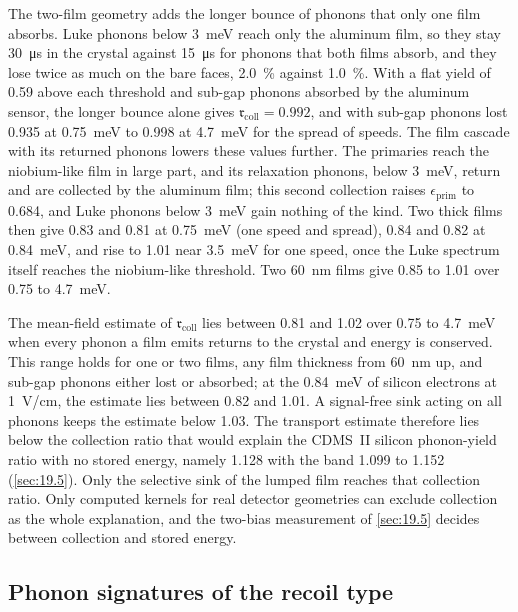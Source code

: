 The two-film geometry adds the longer bounce of phonons that only one film absorbs. Luke phonons below \SI{3}{meV} reach only the aluminum film, so they stay \SI{30}{\micro s} in the crystal against \SI{15}{\micro s} for phonons that both films absorb, and they lose twice as much on the bare faces, \SI{2.0}{\percent} against \SI{1.0}{\percent}. With a flat yield of 0.59 above each threshold and sub-gap phonons absorbed by the aluminum sensor, the longer bounce alone gives $\mathfrak{r}_{\mathrm{coll}} = 0.992$, and with sub-gap phonons lost 0.935 at \SI{0.75}{meV} to 0.998 at \SI{4.7}{meV} for the spread of speeds. The film cascade with its returned phonons lowers these values further. The primaries reach the niobium-like film in large part, and its relaxation phonons, below \SI{3}{meV}, return and are collected by the aluminum film; this second collection raises $\epsilon_{\mathrm{prim}}$ to 0.684, and Luke phonons below \SI{3}{meV} gain nothing of the kind. Two thick films then give 0.83 and 0.81 at \SI{0.75}{meV} (one speed and spread), 0.84 and 0.82 at \SI{0.84}{meV}, and rise to 1.01 near \SI{3.5}{meV} for one speed, once the Luke spectrum itself reaches the niobium-like threshold. Two \SI{60}{nm} films give 0.85 to 1.01 over 0.75 to \SI{4.7}{meV}.

The mean-field estimate of $\mathfrak{r}_{\mathrm{coll}}$ lies between 0.81 and 1.02 over 0.75 to \SI{4.7}{meV} when every phonon a film emits returns to the crystal and energy is conserved. This range holds for one or two films, any film thickness from \SI{60}{nm} up, and sub-gap phonons either lost or absorbed; at the \SI{0.84}{meV} of silicon electrons at \SI{1}{V/cm}, the estimate lies between 0.82 and 1.01. A signal-free sink acting on all phonons keeps the estimate below 1.03. The transport estimate therefore lies below the collection ratio that would explain the CDMS~II silicon phonon-yield ratio with no stored energy, namely 1.128 with the band 1.099 to 1.152 (\cref{sec:19.5}). Only the selective sink of the lumped film reaches that collection ratio. Only computed kernels for real detector geometries can exclude collection as the whole explanation, and the two-bias measurement of \cref{sec:19.5} decides between collection and stored energy.

\subsection{Phonon signatures of the recoil type}\label{sec:20.5-routes}

